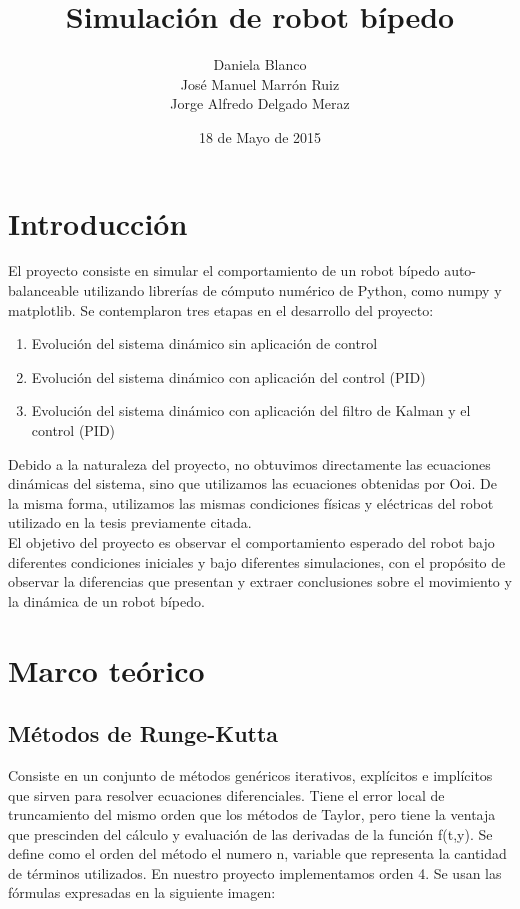 \documentclass[10pt]{article}
\title{Simulación de robot bípedo}
\date{18 de Mayo de 2015}
\author{
	Daniela Blanco\\
	José Manuel Marrón Ruiz\\
	Jorge Alfredo Delgado Meraz
}
\begin{document}
\maketitle
\section{Introducción}
El proyecto consiste en simular el comportamiento de un robot bípedo auto-balanceable utilizando librerías de cómputo numérico de Python, como numpy y matplotlib. Se contemplaron tres etapas en el desarrollo del proyecto:
\begin{enumerate}
\item Evolución del sistema dinámico sin aplicación de control
\item Evolución del sistema dinámico con aplicación del control (PID)
\item Evolución del sistema dinámico con aplicación del filtro de Kalman y el control (PID)
\end{enumerate}
Debido a la naturaleza del proyecto, no obtuvimos directamente las ecuaciones dinámicas del sistema, sino que utilizamos las ecuaciones obtenidas por Ooi\cite{ooi03}. De la misma forma, utilizamos las mismas condiciones físicas y eléctricas del robot utilizado en la tesis previamente citada.\\
El objetivo del proyecto es observar el comportamiento esperado del robot bajo diferentes condiciones iniciales y bajo diferentes simulaciones, con el propósito de observar la diferencias que presentan y extraer conclusiones sobre el movimiento y la dinámica de un robot bípedo. 
\section{Marco teórico}
\subsection{Métodos de Runge-Kutta}
Consiste en un conjunto de métodos genéricos iterativos, explícitos e implícitos que sirven para resolver ecuaciones diferenciales. Tiene el error local de truncamiento del mismo orden que los métodos de Taylor, pero tiene la ventaja que prescinden del cálculo y evaluación de las derivadas de la función f(t,y). Se define como el orden del método el numero n, variable que representa la cantidad de términos utilizados. En nuestro proyecto implementamos orden 4. Se usan las fórmulas expresadas en la siguiente imagen:
\begin{center}
\end{center}
\end{document}
